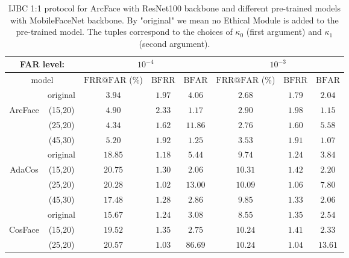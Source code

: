 \documentclass[nohyperref]{article}
\theoremstyle{plain}
\theoremstyle{definition}
\theoremstyle{remark}
\begin{document}
\begin{table*}
\center
\caption{IJBC 1:1 protocol for ArcFace with ResNet100 backbone and different pre-trained models with MobileFaceNet backbone. By "original" we mean no Ethical Module is added to the pre-trained model. The tuples correspond to the choices of $\kappa_0$ (first argument) and $\kappa_1$ (second argument).}
\begin{tabular}{ c | c | ccc | ccc}
 \multicolumn{2}{c}{ FAR level: }         & \multicolumn{3}{c}{ $10^{-4}$} & \multicolumn{3}{c}{ $10^{-3}$} \\ 
 \hline \hline
  \multicolumn{2}{c}{ model }    & $\mathrm{FRR}@\mathrm{FAR}$ (\%)  & $\mathrm{BFRR}$  & $\mathrm{BFAR}$  & $\mathrm{FRR}@\mathrm{FAR}$ (\%)  & $\mathrm{BFRR}$        & $\mathrm{BFAR}$        \\ \hline
                              & original  & $\mathbf{3.94}$  & $1.97$ & $4.06$  & $\mathbf{2.68}$  & $1.79$  & $2.04$  \\
  \multirow{2}{*}{ArcFace}    & (15,20) & $4.90$  & $2.33$ & $\mathbf{1.17}$  & $2.90$  & $1.98$  & $1.15$  \\
                              & (25,20) & $4.34$  & $\mathbf{1.62}$ & $11.86$ & $2.76$  & $\mathbf{1.60}$  & $5.58$  \\
                              & (45,30) & $5.20$  & $1.92$ & $1.25$  & $3.53$  & $1.91$  & $\mathbf{1.07}$  \\ \hline   \hline   
                              & original  & $18.85$ & $1.18$ & $5.44$  & $\mathbf{9.74}$  & $1.24$  & $3.84$  \\
  \multirow{2}{*}{AdaCos}     & (15,20) & $20.75$ & $1.30$ & $\mathbf{2.06}$  & $10.31$ & $1.42$  & $2.20$  \\
                              & (25,20) & $20.28$ & $\mathbf{1.02}$ & $13.00$ & $10.09$ & $\mathbf{1.06}$  & $7.80$  \\
                              & (45,30) & $\mathbf{17.48}$ & $1.28$ & $2.86$  & $9.85$  & $1.33$  & $\mathbf{2.06}$  \\ \hline 
                              & original  & $\mathbf{15.67}$ & $1.24$ & $3.08$  & $\mathbf{8.55}$  & $1.35$  & $2.54$  \\
\multirow{2}{*}{CosFace}  & (15,20) & $19.52$ & $1.35$ & $\mathbf{2.75}$  & $10.24$ & $1.41$  & $\mathbf{2.33}$  \\
                              & (25,20) & $20.57$ & $\mathbf{1.03}$ & $86.69$ & $10.24$ & $\mathbf{1.04}$  & $13.61$ \\

\end{tabular}
\end{table*}
\end{document}

